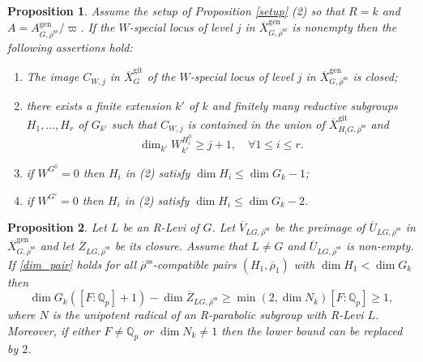 \documentclass[10pt,a4paper]{amsart}
\newtheorem{prop}{Proposition}
\newcommand{\Qp}{\mathbb {Q}_p}
\newcommand{\Ubar}{\overline{U}}
\newcommand{\Vbar}{\overline{{V}}}
\newcommand{\Xbar}{\overline{X}}
\newcommand{\XbargpsG}{\overline{X}^{\gps}_G}
\newcommand{\Zbar}{\overline{Z}}
\newcommand{\gen}{\mathrm{gen}}
\newcommand{\gps}{\mathrm{git}}
\newcommand{\rhobar}{\overline{\rho}}
\newcommand{\rhobarss}{\rhobar^{\mathrm{ss}}}
\begin{document}
\begin{prop}\label{WGH} Assume the setup of Proposition  \ref{setup} (2) so that 
$R=k$ and $A=A^{\gen}_{G, \rhobarss}/\varpi$. If the $W$-special locus of 
level $j$ in $\Xbar^{\gen}_{G, \rhobarss}$ is nonempty then 
the following assertions hold: 
\begin{enumerate} 
\item The image $C_{W,j}$ in $\XbargpsG$ of the $W$-special locus of level $j$ in $\Xbar^{\gen}_{G, \rhobarss}$ is closed;
\item there exists a finite extension $k'$ of $k$ and 
finitely many reductive subgroups $H_1, \ldots, H_r$ of $G_{k'}$ such that 
$C_{W,j}$ is contained in the union of $\Xbar^{\gps}_{H_iG, \rhobarss}$ and 
$$ \dim_{k'} W_{k'}^{H_i^0} \ge j+1, \quad \forall 1\le i\le r.$$
\item if $W^{G^0}=0$ then $H_i$ in (2) satisfy
$\dim H_i\le \dim G_k-1$;
\item if $W^{G'}=0$ then $H_i$ in (2) satisfy $\dim H_i\le \dim G_k -2$. 
\end{enumerate}
\end{prop} 

\begin{prop}\label{bound_Levi} 
    Let $L$ be an R-Levi of $G$. Let $\Vbar_{LG, \rhobarss}$ be 
    the preimage of $\Ubar_{LG, \rhobarss}$ in $\Xbar^{\gen}_{G, \rhobarss}$ and let $\Zbar_{LG, \rhobarss}$ be 
    its closure. Assume that $L\neq G$ and $\Ubar_{LG, \rhobarss}$ is non-empty.
    If \eqref{dim_pair} holds for all $\rhobarss$-compatible pairs $(H_1, \rhobar_1)$ with $\dim H_1< \dim G_k$ then
    \begin{equation}\label{eq_result}
    \dim G_k ([F:\Qp]+1) - \dim \Zbar_{LG, \rhobarss} \ge\min(2, \dim N_k) [F:\Qp]\ge 1, 
    \end{equation}
    where $N$ is the unipotent radical 
    of an R-parabolic subgroup with R-Levi $L$. Moreover, if either $F\neq \Qp$ or $\dim N_k \neq 1$
    then the lower bound can be replaced by $2$. 
\end{prop}
\end{document}
